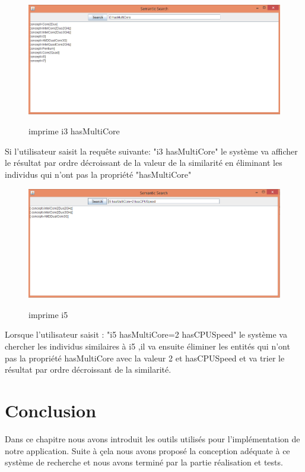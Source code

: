 \begin{itemize}
                    \begin{figure}[H]
                    \centering
                    \includegraphics[width=15cm]{imprime_i3_hasMultiCore}\\
                    \caption{imprime i3 hasMultiCore}\label{imprime i3 hasMultiCore}
                    \end{figure}
                      Si l'utilisateur saisit la requête suivante: "i3 hasMultiCore" le système va afficher le résultat par ordre décroissant de la valeur de la similarité en éliminant les individus qui n'ont pas la propriété "hasMultiCore"
                    \begin{figure}[H]
                    \centering
                    \includegraphics[width=15cm]{imprime_i5}\\
                    \caption{imprime i5 }\label{imprime i5}
                    \end{figure}
                    Lorsque l'utilisateur saisit : "i5 hasMultiCore=2 hasCPUSpeed" le système va chercher les individus similaires à i5 ,il va ensuite éliminer les entités qui n'ont pas la propriété hasMultiCore avec la valeur 2 et hasCPUSpeed et va trier le résultat par ordre décroissant de la similarité.

            \end{itemize}



\section{Conclusion}
    Dans ce chapitre nous avons introduit les outils utilisés pour l'implémentation de notre application. Suite à çela nous avons proposé la conception adéquate à ce système de recherche et nous avons terminé par la partie réalisation et tests.\\















